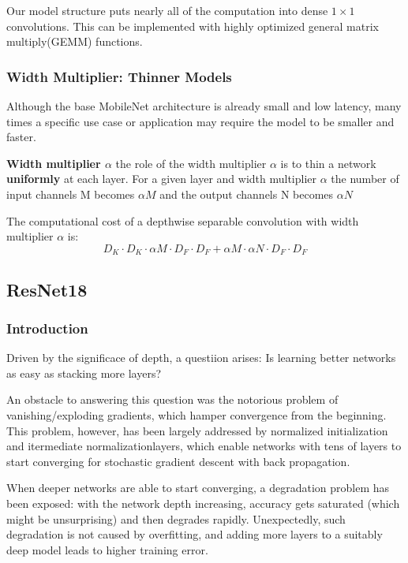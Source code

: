 \documentclass[11pt,en,bibstyle=ieeetr]{elegantpaper}
\begin{document}
Our model structure puts nearly all of the computation into dense $ 1\times 1 $ convolutions. This can be implemented with highly optimized general matrix multiply(GEMM) functions.

\subsubsection{Width Multiplier: Thinner Models}

Although the base MobileNet architecture is already small and low latency, many times a specific use case
or application may require the model to be smaller and faster.

\textbf{Width multiplier $ \alpha$} the role of the width multiplier $ \alpha$ is to thin a network \textbf{uniformly} at each layer.
For a given layer and width multiplier $ \alpha $ the number of input channels M becomes $ \alpha M$ and the output channels N becomes $ \alpha N $

The computational cost of a depthwise separable convolution with width multiplier $ \alpha$ is:
$$ 
D_K \cdot D_K \cdot \alpha M \cdot D_F \cdot D_F + \alpha M \cdot \alpha N \cdot D_F \cdot D_F
$$



\subsection{ResNet18}

\subsubsection{Introduction}
Driven by the significace of depth, a questiion arises: Is learning better networks as easy as stacking more layers?

An obstacle to answering this question was the notorious problem of vanishing/exploding gradients, which hamper convergence from the beginning. This problem, however, has been 
largely addressed by normalized initialization and itermediate normalizationlayers, which enable networks with tens of layers to start converging for 
stochastic gradient descent with back propagation.

When deeper networks are able to start converging, a degradation problem has been exposed: with the network
depth increasing, accuracy gets saturated (which might be unsurprising) and then degrades rapidly.
Unexpectedly, such degradation is not caused by  overfitting, and adding more layers to a suitably deep model leads to higher training error.
\end{document}
